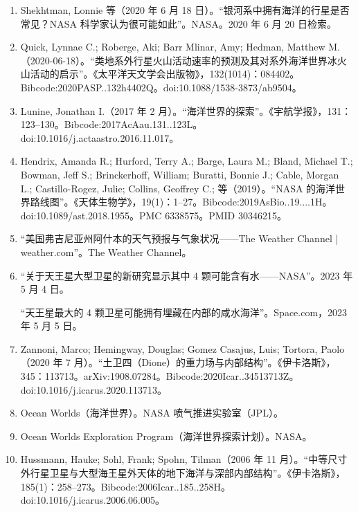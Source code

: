\begin{enumerate}
\item Shekhtman, Lonnie 等（2020 年 6 月 18 日）。“银河系中拥有海洋的行星是否常见？NASA 科学家认为很可能如此”。NASA。2020 年 6 月 20 日检索。

\item Quick, Lynnae C.; Roberge, Aki; Barr Mlinar, Amy; Hedman, Matthew M.（2020-06-18）。“类地系外行星火山活动速率的预测及其对系外海洋世界冰火山活动的启示”。《太平洋天文学会出版物》，132(1014)：084402。Bibcode:2020PASP..132h4402Q。doi:10.1088/1538-3873/ab9504。

\item Lunine, Jonathan I.（2017 年 2 月）。“海洋世界的探索”。《宇航学报》，131：123–130。Bibcode:2017AcAau.131..123L。doi:10.1016/j.actaastro.2016.11.017。

\item Hendrix, Amanda R.; Hurford, Terry A.; Barge, Laura M.; Bland, Michael T.; Bowman, Jeff S.; Brinckerhoff, William; Buratti, Bonnie J.; Cable, Morgan L.; Castillo-Rogez, Julie; Collins, Geoffrey C.; 等（2019）。“NASA 的海洋世界路线图”。《天体生物学》，19(1)：1–27。Bibcode:2019AsBio..19....1H。doi:10.1089/ast.2018.1955。PMC 6338575。PMID 30346215。

\item “美国弗吉尼亚州阿什本的天气预报与气象状况——The Weather Channel | weather.com”。The Weather Channel。

\item “关于天王星大型卫星的新研究显示其中 4 颗可能含有水——NASA”。2023 年 5 月 4 日。

“天王星最大的 4 颗卫星可能拥有埋藏在内部的咸水海洋”。Space.com，2023 年 5 月 5 日。

\item Zannoni, Marco; Hemingway, Douglas; Gomez Casajus, Luis; Tortora, Paolo（2020 年 7 月）。“土卫四（Dione）的重力场与内部结构”。《伊卡洛斯》，345：113713。arXiv:1908.07284。Bibcode:2020Icar..34513713Z。doi:10.1016/j.icarus.2020.113713。

\item Ocean Worlds（海洋世界）。NASA 喷气推进实验室（JPL）。

\item Ocean Worlds Exploration Program（海洋世界探索计划）。NASA。

\item Hussmann, Hauke; Sohl, Frank; Spohn, Tilman（2006 年 11 月）。“中等尺寸外行星卫星与大型海王星外天体的地下海洋与深部内部结构”。《伊卡洛斯》，185(1)：258–273。Bibcode:2006Icar..185..258H。doi:10.1016/j.icarus.2006.06.005。


\end{enumerate}
